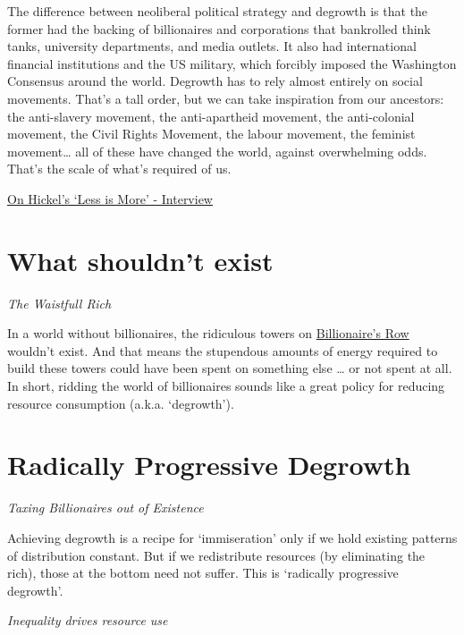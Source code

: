 \documentclass[
]{book}
\begin{document}
The difference between neoliberal political strategy and degrowth is that the former had the backing of billionaires and corporations that bankrolled think tanks, university departments, and media outlets. It also had international financial institutions and the US military, which forcibly imposed the Washington Consensus around the world. Degrowth has to rely almost entirely on social movements. That's a tall order, but we can take inspiration from our ancestors: the anti-slavery movement, the anti-apartheid movement, the anti-colonial movement, the Civil Rights Movement, the labour movement, the feminist movement\ldots{} all of these have changed the world, against overwhelming odds. That's the scale of what's required of us.

\href{https://www.the-trouble.com/content/2021/2/11/ecosocialism-is-the-horizon-degrowth-is-the-way}{On Hickel's `Less is More' - Interview}

\hypertarget{what-shouldnt-exist}{%
\section{What shouldn't exist}\label{what-shouldnt-exist}}

\emph{The Waistfull Rich}

In a world without billionaires, the ridiculous towers on
\href{https://dyrehaugen.github.io/rurb/high-rise-building.html}{Billionaire's Row} wouldn't exist.
And that means the stupendous amounts of energy required to build these towers
could have been spent on something else \ldots{} or not spent at all.
In short, ridding the world of billionaires sounds like a
great policy for reducing resource consumption (a.k.a. `degrowth').

\hypertarget{radically-progressive-degrowth}{%
\section{Radically Progressive Degrowth}\label{radically-progressive-degrowth}}

\emph{Taxing Billionaires out of Existence}

Achieving degrowth is a recipe for `immiseration' only if we hold
existing patterns of distribution constant.
But if we redistribute resources (by eliminating the rich),
those at the bottom need not suffer.
This is `radically progressive degrowth'.

\emph{Inequality drives resource use}
\end{document}
